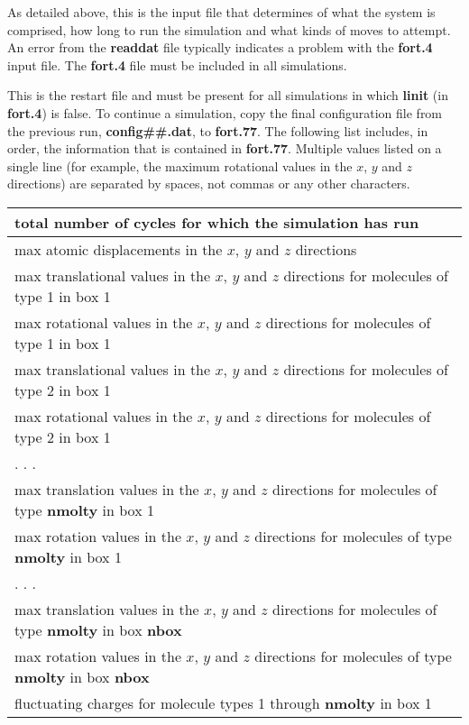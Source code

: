 \documentclass[12pt,letterpaper]{article}
\begin{document}
{{{{{{{
As detailed above, this is the input file that determines of what the system is comprised, how long to run the simulation and what kinds of moves to attempt.  An error from the {\textbf{readdat}} file typically indicates a problem with the {\textbf{fort.4}} input file.
The {\textbf{fort.4}} file must be included in all simulations.  

This is the restart file and must be present for all simulations in which {\textbf{linit}} 
(in {\bf fort.4}) is false. 
To continue a simulation, copy the final configuration file from the previous run, {\bf config\#\#.dat}, to {\bf fort.77}.
The following list includes, in order, the information that is contained in {\bf fort.77}.  
Multiple values listed on a single line (for example, the maximum rotational values in the $x$, $y$ and $z$ directions) 
are separated by spaces, not commas or any other characters. 
\begin{center}
\begin{tabular}{| l |}
\hline
total number of cycles for which the simulation has run \\ \hline
max atomic displacements in the $x$, $y$ and $z$ directions  \\ \hline
max translational values in the $x$, $y$ and $z$ directions for molecules of type 1 in box 1 \\ \hline 
max rotational values in the $x$, $y$ and $z$ directions for molecules of type 1 in box 1 \\ \hline
max translational values in the $x$, $y$ and $z$ directions for molecules of type 2 in box 1 \\ \hline
max rotational values in the $x$, $y$ and $z$ directions for molecules of type 2 in box 1 \\ \hline
  . . . \\ \hline
max translation values in the $x$, $y$ and $z$ directions for molecules of type {\bf nmolty} in box 1 \\ \hline
max rotation values in the $x$, $y$ and $z$ directions for molecules of type {\bf nmolty} in box 1 \\ \hline
  . . . \\ \hline
max translation values in the $x$, $y$ and $z$ directions for molecules of type {\bf nmolty} in box {\bf nbox} \\ \hline
max rotation values in the $x$, $y$ and $z$ directions for molecules of type {\bf nmolty} in box {\bf nbox} \\ \hline
fluctuating charges for molecule types 1 through {\bf nmolty} in box 1 \\ \hline

\end{tabular}
\end{center}}}}}}}}
\end{document}
